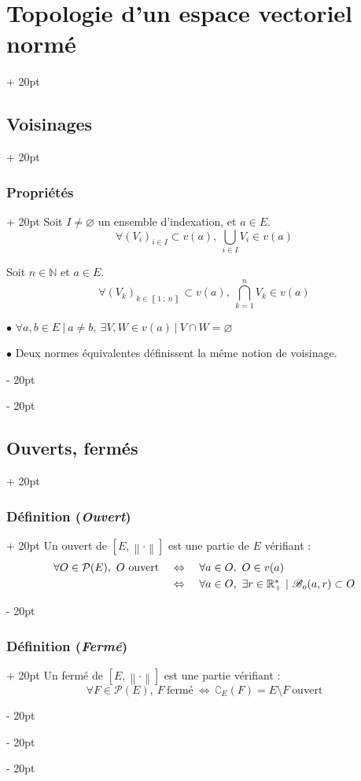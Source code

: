 \documentclass[a4paper, 12pt, twoside]{article}
\newcommand{\N}{\mathbb{N}} %
\newcommand{\R}{\mathbb{R}} %
\newcommand{\nset}[2]{\left\llbracket #1\ ;\ #2 \right\rrbracket}
\newcommand{\lr}[1]{\left( #1 \right)}
\newcommand{\norm}[1]{\left\lVert #1 \right\rVert}
\newcommand{\ssi}{\ \Leftrightarrow \ }
\newcommand{\ind}[1][20pt]{\advance\leftskip + #1}
\newcommand{\deind}[1][20pt]{\advance\leftskip - #1}
\newenvironment{indt}[2][20pt]{#2 \par \ind[#1]}{\par \deind} %
\begin{document}
\begin{indt}{\section{Topologie d'un espace vectoriel normé}}
\begin{indt}{\subsection{Voisinages}}
\begin{indt}{\subsubsection{Propriétés}}
                Soit $I \neq \varnothing$ un ensemble d'indexation, et $a \in E$.
                \[
                    \forall \lr{V_i}_{i \in I} \subset v(a),\
                    \bigcup_{i \in I} V_i \in v(a)
                \]

                Soit $n \in \N$ et $a \in E$.
                \[
                    \forall \!\lr{V_k}_{k \in \nset 1 n} \subset v(a),\
                    \bigcap_{k = 1}^n V_k \in v(a)
                \]

                $\bullet$ $
                    \forall a, b \in E\ |\ a \neq b,\
                    \exists V, W \in v(a)\ |\ V \cap W = \varnothing
                $

                $\bullet$ Deux normes équivalentes définissent la même notion de voisinage.
            \end{indt}
        \end{indt}

        \vspace{12pt}
        
        \begin{indt}{\subsection{Ouverts, fermés}}
            \begin{indt}{\subsubsection{Définition (\textit{Ouvert})}}
                Un ouvert de $[E, \norm \cdot]$ est une partie de $E$ vérifiant :
                \[
                    \begin{array}{rcl}
                        \forall O \in \mathcal P(E),\
                        O\ \text{ouvert}
                        &\ssi&
                        \forall a \in O,\ O \in v(a)
                        \vspace{3pt}
                        \\
                        &\ssi&
                        \forall a \in O,\ \exists r \in \R^*_+\ |\ \mathscr B_o(a, r) \subset O
                    \end{array}
                \]
            \end{indt}

            \vspace{12pt}
            
            \begin{indt}{\subsubsection{Définition (\textit{Fermé})}}
                Un fermé de $[E, \norm \cdot]$ est une partie vérifiant :
                \[
                    \forall F \in \mathcal P(E),\
                    F\ \text{fermé}
                    \ssi
                    \complement_E(F) = E \setminus F\ \text{ouvert}
                \]
            \end{indt}


\end{indt}
\end{indt}
\end{document}

